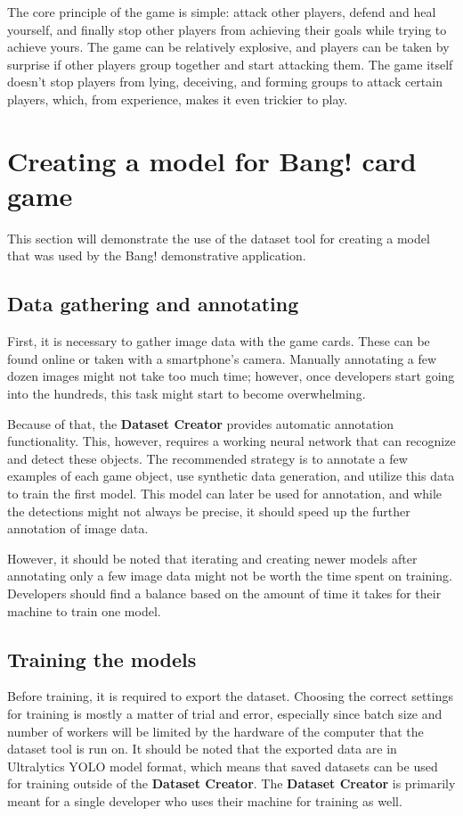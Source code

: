 The core principle of the game is simple: attack other players, defend and heal yourself, and finally stop other players from achieving their goals while trying to achieve yours. The game can be relatively explosive, and players can be taken by surprise if other players group together and start attacking them. The game itself doesn’t stop players from lying, deceiving, and forming groups to attack certain players, which, from experience, makes it even trickier to play.



\section{Creating a model for Bang! card game}
This section will demonstrate the use of the dataset tool for creating a model that was used by the Bang! demonstrative application.

\subsection{Data gathering and annotating}
First, it is necessary to gather image data with the game cards. These can be found online or taken with a smartphone's camera. Manually annotating a few dozen images might not take too much time; however, once developers start going into the hundreds, this task might start to become overwhelming. 

Because of that, the \textbf{Dataset Creator} provides automatic annotation functionality. This, however, requires a working neural network that can recognize and detect these objects. The recommended strategy is to annotate a few examples of each game object, use synthetic data generation, and utilize this data to train the first model. This model can later be used for annotation, and while the detections might not always be precise, it should speed up the further annotation of image data.

However, it should be noted that iterating and creating newer models after annotating only a few image data might not be worth the time spent on training. Developers should find a balance based on the amount of time it takes for their machine to train one model.

\subsection{Training the models}
Before training, it is required to export the dataset. Choosing the correct settings for training is mostly a matter of trial and error, especially since batch size and number of workers will be limited by the hardware of the computer that the dataset tool is run on. It should be noted that the exported data are in Ultralytics YOLO model format, which means that saved datasets can be used for training outside of the \textbf{Dataset Creator}. The \textbf{Dataset Creator} is primarily meant for a single developer who uses their machine for training as well.

